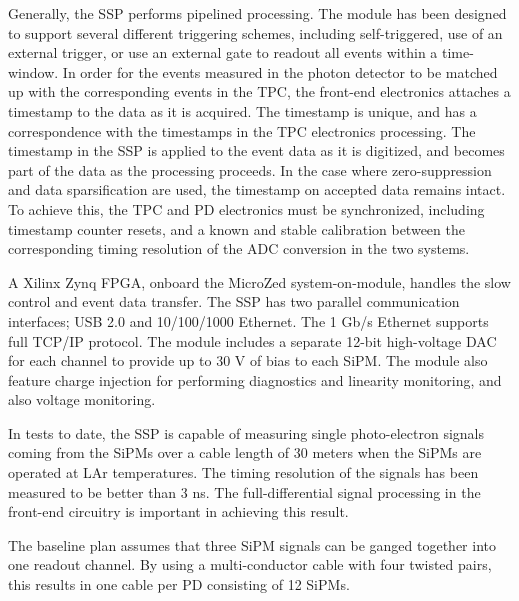 Generally, the SSP performs pipelined processing.  
The module has been designed to support several different triggering schemes, 
including self-triggered, use of an external trigger, or use an 
external gate to readout all events within a time-window.  
In order for the events measured in the photon detector to be matched up 
with the corresponding events in the TPC, the front-end electronics 
attaches a timestamp to the data as it is acquired.  
The timestamp is unique, and has a correspondence with the timestamps in 
the TPC electronics processing.  
The timestamp in the SSP is applied to the event data as it is digitized, 
and becomes part of the data as the processing proceeds.  
In the case where zero-suppression and data sparsification are used, 
the timestamp on accepted data remains intact.  
To achieve this, the TPC and PD electronics must be synchronized, 
including timestamp counter resets, and a known and stable calibration between 
the corresponding timing resolution of the ADC conversion in the two systems.  

A Xilinx Zynq FPGA, onboard the MicroZed system-on-module, handles the 
slow control and event data transfer.  
The SSP has two parallel communication interfaces; USB 2.0 and 10/100/1000 Ethernet.  
The 1 Gb/s Ethernet supports full TCP/IP protocol.  
The module includes a separate 12-bit high-voltage DAC for each channel to 
provide up to 30 V of bias to each SiPM.  
The module also feature charge injection for performing diagnostics and linearity 
monitoring, and also voltage monitoring.

In tests to date, the SSP is capable of measuring single photo-electron signals 
coming from the SiPMs over a cable length of 30 meters when the SiPMs are 
operated at LAr temperatures.  
The timing resolution of the signals has been measured to be better than 3 ns.  
The full-differential signal processing in the front-end circuitry 
is important in achieving this result.

The baseline plan assumes that three SiPM signals can be ganged 
together into one readout channel. 
By using a multi-conductor cable with four twisted pairs, this 
results in one cable per PD consisting of 12 SiPMs.      

